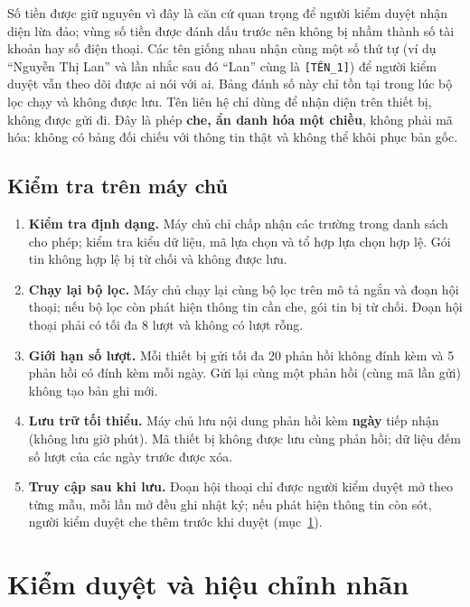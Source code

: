 \documentclass[11pt,a4paper]{article}
\newcommand{\gc}[1]{\texttt{#1}}
\begin{document}
Số tiền được giữ nguyên vì đây là căn cứ quan trọng để người kiểm duyệt nhận diện lừa đảo; vùng số tiền được đánh
dấu trước nên không bị nhầm thành số tài khoản hay số điện thoại. Các tên giống nhau nhận cùng một số thứ tự
(ví dụ ``Nguyễn Thị Lan'' và lần nhắc sau đó ``Lan'' cùng là \gc{[TÊN\_1]}) để người kiểm duyệt vẫn theo dõi được ai nói với ai.
Bảng đánh số này chỉ tồn tại trong lúc bộ lọc chạy và không được lưu. Tên liên hệ chỉ dùng để nhận diện trên
thiết bị, không được gửi đi. Đây là phép \textbf{che, ẩn danh hóa một chiều}, không phải mã hóa: không có bảng
đối chiếu với thông tin thật và không thể khôi phục bản gốc.

\subsection{Kiểm tra trên máy chủ}

\begin{enumerate}[leftmargin=*]
\item \textbf{Kiểm tra định dạng.} Máy chủ chỉ chấp nhận các trường trong danh sách cho phép; kiểm tra kiểu dữ
  liệu, mã lựa chọn và tổ hợp lựa chọn hợp lệ. Gói tin không hợp lệ bị từ chối và không được lưu.
\item \textbf{Chạy lại bộ lọc.} Máy chủ chạy lại cùng bộ lọc trên mô tả ngắn và đoạn hội thoại; nếu bộ lọc còn
  phát hiện thông tin cần che, gói tin bị từ chối. Đoạn hội thoại phải có tối đa 8 lượt và không có lượt rỗng.
\item \textbf{Giới hạn số lượt.} Mỗi thiết bị gửi tối đa 20 phản hồi không đính kèm và 5 phản hồi có đính kèm mỗi
  ngày. Gửi lại cùng một phản hồi (cùng mã lần gửi) không tạo bản ghi mới.
\item \textbf{Lưu trữ tối thiểu.} Máy chủ lưu nội dung phản hồi kèm \textbf{ngày} tiếp nhận (không lưu giờ phút).
  Mã thiết bị không được lưu cùng phản hồi; dữ liệu đếm số lượt của các ngày trước được xóa.
\item \textbf{Truy cập sau khi lưu.} Đoạn hội thoại chỉ được người kiểm duyệt mở theo từng mẫu, mỗi lần mở đều ghi
  nhật ký; nếu phát hiện thông tin còn sót, người kiểm duyệt che thêm trước khi duyệt (mục~\ref{sec:duyet}).
\end{enumerate}

\section{Kiểm duyệt và hiệu chỉnh nhãn}
\label{sec:duyet}
\end{document}
